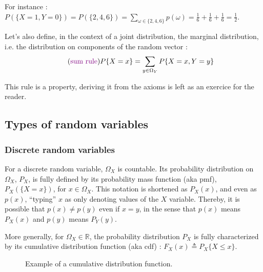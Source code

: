 \documentclass[12pt]{report}
\def\R{\mathbb{R}}
\newcommand{\defobj}[1]{\color{red}#1\color{black}{}}
\newcommand{\defmean}[1]{\color{green!70!black}#1\color{black}{}}
\renewcommand{\emph}[1]{\color{violet}#1\color{black}{}}
\begin{document}
For instance : $\displaystyle P(\{X=1, Y=0\}) = P(\{2,4,6\}) = \sum_{\omega \in \{2,4,6\}}p(\omega) = \frac{1}{6} + \frac{1}{6} + \frac{1}{6} = \frac{1}{2}$.

Let's also define, in the context of a joint distribution, the \defobj{marginal distribution}, i.e. the distribution on components of the random vector :
\defmean{\[
  \tag{\emph{sum rule}}
  P\{X=x\} = \sum_{y\in\Omega_Y}P\{X=x, Y=y\}
\]}

This rule is a property, deriving it from the axioms is left as an exercice for the reader.

\subsection{Types of random variables}

\subsubsection{Discrete random variables}
For a \defobj{discrete random variable}, \defmean{$\Omega_X$ is countable}. Its
probability distribution on $\Omega_X$, $P_X$, is fully defined by its
\defobj{probability mass function} (aka \emph{pmf}), \defmean{$P_X(\{X=x\})$,
  for $x \in \Omega_X$}. This notation is shortened as $P_X(x)$, and even as
$p(x)$, ``typing'' $x$ as only denoting values of the $X$ variable. Thereby, it
is possible that $p(x) \neq p(y)$ even if $x=y$, in the sense that $p(x)$ means
$P_X(x)$ and $p(y)$ means $P_Y(y)$.

More generally, for $\Omega_X \in \R$, the probability distribution $P_X$ is fully characterized by its \defobj{cumulative distribution function} (aka \emph{cdf}) : \defmean{$F_X(x) \triangleq P_X\{X \leq x\}$}.

\begin{wrapfigure}[6]{R}{0pt}
  \caption*{\small{Example of a cumulative distribution function.}}
\end{wrapfigure}
\end{document}
